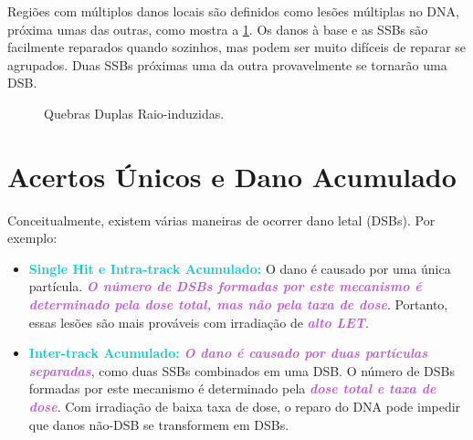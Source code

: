 \documentclass[11pt,a4paper]{article}
\newcounter{exemplo}
\begin{document}
	Regiões com múltiplos danos locais são definidos como lesões múltiplas no DNA, próxima umas das outras, como mostra a \ref{fig:dbsRadioInduzisd}. Os danos à base e as SSBs são facilmente reparados quando sozinhos, mas podem ser muito difíceis de reparar se agrupados. Duas SSBs próximas uma da outra provavelmente se tornarão uma DSB.

	\begin{figure}[h]
		\centering
		\caption{Quebras Duplas Raio-induzidas.}
		\label{fig:dbsRadioInduzisd}
	\end{figure}


\section{Acertos Únicos e Dano Acumulado}

	Conceitualmente, existem várias maneiras de ocorrer dano letal (DSBs). Por exemplo:

	\begin{itemize}[label=\textcolor{CarnationPink}{$\blacksquare$}]
		\item \textcolor{DarkTurquoise}{\textbf{Single Hit e Intra-track Acumulado:}} O dano é causado por uma única partícula. \textcolor{MediumOrchid}{\textbf{\textit{O número de DSBs formadas por este mecanismo é determinado pela dose total, mas não pela taxa de dose}}}. Portanto, essas lesões são mais prováveis com irradiação de \textcolor{MediumOrchid}{\textbf{\textit{alto LET}}}.
		\item \textcolor{DarkTurquoise}{\textbf{Inter-track Acumulado:}} \textcolor{MediumOrchid}{\textbf{\textit{O dano é causado por duas partículas separadas}}}, como duas SSBs combinados em uma DSB. O número de DSBs formadas por este mecanismo é determinado pela \textcolor{MediumOrchid}{\textbf{\textit{dose total e taxa de dose}}}. Com irradiação de baixa taxa de dose, o reparo do DNA pode impedir que danos não-DSB se transformem em DSBs.
	\end{itemize}
\end{document}
